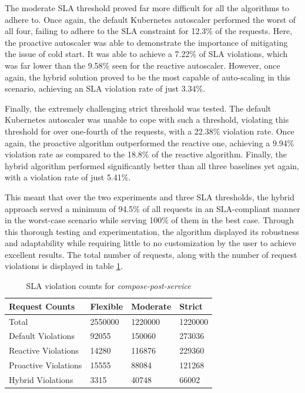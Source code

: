 The moderate SLA threshold proved far more difficult for all the algorithms to adhere to. Once again, the default Kubernetes autoscaler performed the worst of all four, failing to adhere to the SLA constraint for 12.3\% of the requests. Here, the proactive autoscaler was able to demonstrate the importance of mitigating the issue of cold start. It was able to achieve a 7.22\% of SLA violations, which was far lower than the 9.58\% seen for the reactive autoscaler. However, once again, the hybrid solution proved to be the most capable of auto-scaling in this scenario, achieving an SLA violation rate of just 3.34\%.

Finally, the extremely challenging strict threshold was tested. The default Kubernetes autoscaler was unable to cope with such a threshold, violating this threshold for over one-fourth of the requests, with a 22.38\% violation rate. Once again, the proactive algorithm outperformed the reactive one, achieving a 9.94\% violation rate as compared to the 18.8\% of the reactive algorithm. Finally, the hybrid algorithm performed significantly better than all three baselines yet again, with a violation rate of just 5.41\%.\par

This meant that over the two experiments and three SLA thresholds, the hybrid approach served a minimum of 94.5\% of all requests in an SLA-compliant manner in the worst-case scenario while serving 100\% of them in the best case. Through this thorough testing and experimentation, the algorithm displayed its robustness and adaptability while requiring little to no customization by the user to achieve excellent results. The total number of requests, along with the number of request violations is displayed in table \ref{tab:exp2-sla-violation-count}.\par

\begin{table}
    \caption{SLA violation counts for \textit{compose-post-service}}\label{tab:exp2-sla-violation-count}
    \centering
    \begin{tabular}{|l|l|l|l|}
        \hline
        Request Counts & Flexible & Moderate & Strict \\
        \hline
        Total  & \num[group-separator={,}]{2550000} & \num[group-separator={,}]{1220000} & \num[group-separator={,}]{1220000} \\
        \hline
        Default Violations & \num[group-separator={,}]{92055} & \num[group-separator={,}]{150060} & \num[group-separator={,}]{273036} \\
        Reactive Violations & \num[group-separator={,}]{14280} & \num[group-separator={,}]{116876} & \num[group-separator={,}]{229360} \\
        Proactive Violations & \num[group-separator={,}]{15555} & \num[group-separator={,}]{88084} & \num[group-separator={,}]{121268} \\
        Hybrid Violations & \num[group-separator={,}]{3315} & \num[group-separator={,}]{40748} & \num[group-separator={,}]{66002} \\
         \hline
    \end{tabular}
\end{table}

